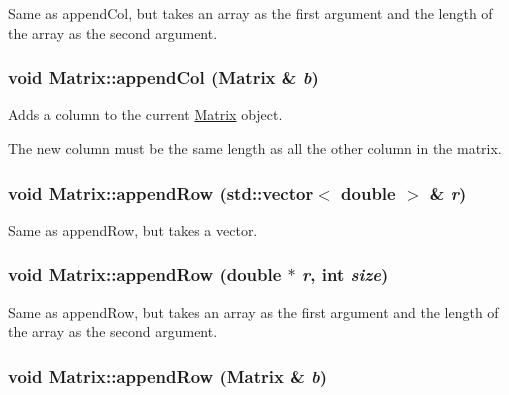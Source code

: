 Same as appendCol, but takes an array as the first argument and the length of the array as the second argument. 

\hypertarget{class_matrix_a6d7061bb02cf34f6c79a01ff25b41e84}{
\subsubsection[{appendCol}]{\setlength{\rightskip}{0pt plus 5cm}void Matrix::appendCol ({\bf Matrix} \& {\em b})}}
\label{class_matrix_a6d7061bb02cf34f6c79a01ff25b41e84}


Adds a column to the current \hyperlink{class_matrix}{Matrix} object. 

The new column must be the same length as all the other column in the matrix. \hypertarget{class_matrix_a934b0686d9a2b971e9740b9a29224a54}{
\subsubsection[{appendRow}]{\setlength{\rightskip}{0pt plus 5cm}void Matrix::appendRow (std::vector$<$ double $>$ \& {\em r})}}
\label{class_matrix_a934b0686d9a2b971e9740b9a29224a54}


Same as appendRow, but takes a vector. 

\hypertarget{class_matrix_a55104cb3fcf93a887ac713955fc0f5c9}{
\subsubsection[{appendRow}]{\setlength{\rightskip}{0pt plus 5cm}void Matrix::appendRow (double $\ast$ {\em r}, \/  int {\em size})}}
\label{class_matrix_a55104cb3fcf93a887ac713955fc0f5c9}


Same as appendRow, but takes an array as the first argument and the length of the array as the second argument. 

\hypertarget{class_matrix_a20c175983a6b23a83fccfe8f726b3b07}{
\subsubsection[{appendRow}]{\setlength{\rightskip}{0pt plus 5cm}void Matrix::appendRow ({\bf Matrix} \& {\em b})}}
\label{class_matrix_a20c175983a6b23a83fccfe8f726b3b07}


